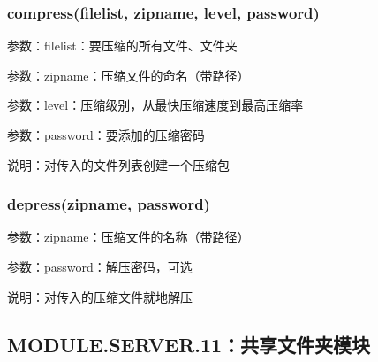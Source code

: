 \subsubsection{compress(filelist, zipname, level, password)}

参数：filelist：要压缩的所有文件、文件夹

参数：zipname：压缩文件的命名（带路径）

参数：level：压缩级别，从最快压缩速度到最高压缩率

参数：password：要添加的压缩密码

说明：对传入的文件列表创建一个压缩包

\subsubsection{depress(zipname, password)}
参数：zipname：压缩文件的名称（带路径）

参数：password：解压密码，可选

说明：对传入的压缩文件就地解压

\subsection{MODULE.SERVER.11：共享文件夹模块}




 
